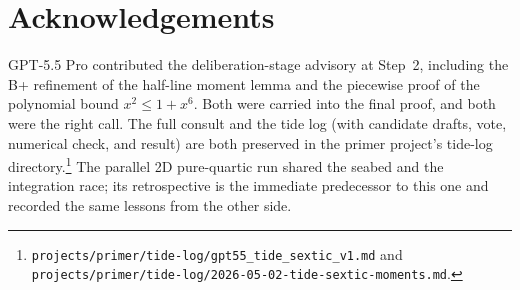 \documentclass[11pt]{article}
\begin{document}
\section*{Acknowledgements}

GPT-5.5 Pro contributed the deliberation-stage advisory at Step~2,
including the B+ refinement of the half-line moment lemma and the piecewise
proof of the polynomial bound $x^2 \leq 1 + x^6$. Both were carried into
the final proof, and both were the right call. The full consult and the
tide log (with candidate drafts, vote, numerical check, and result) are
both preserved in the primer project's tide-log
directory.\footnote{\texttt{projects/primer/tide-log/}\allowbreak\texttt{gpt55\_tide\_sextic\_v1.md}
and
\texttt{projects/primer/tide-log/}\allowbreak\texttt{2026-05-02-tide-sextic-moments.md}.}
The parallel 2D pure-quartic run shared the seabed and the
integration race; its retrospective is the immediate predecessor to this
one and recorded the same lessons from the other side.
\end{document}
